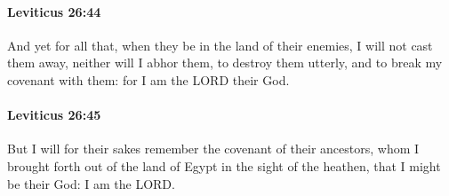 		\paragraph{Leviticus 26:44} %
			\label{LEVITICUS-26-44}

			And yet for all that, when they be in the land of their enemies, I will not cast them away, neither will I abhor them, to destroy them utterly, and to break my covenant with them: for I am the LORD their God.


		\paragraph{Leviticus 26:45} %
			\label{LEVITICUS-26-45}

			But I will for their sakes remember the covenant of their ancestors, whom I brought forth out of the land of Egypt in the sight of the heathen, that I might be their God: I am the LORD.

